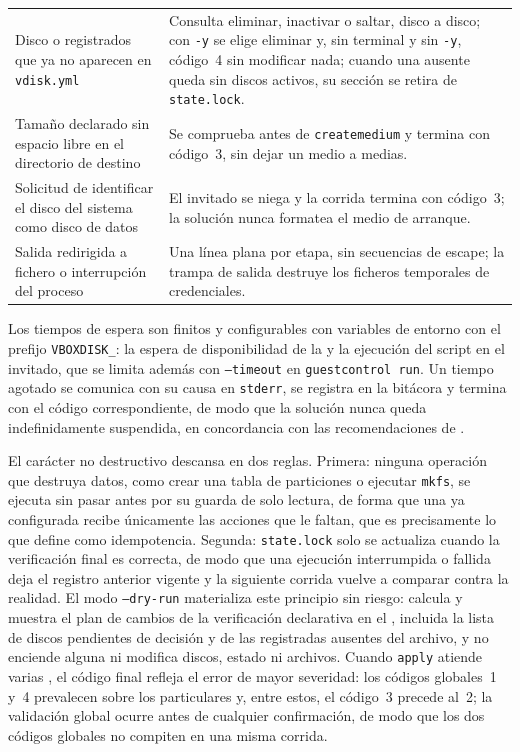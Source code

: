 \begin{table}[H]
\begin{tabular}{@{}p{5.8cm}p{10.0cm}@{}}
        Disco o \vm{} registrados que ya no aparecen en \texttt{vdisk.yml} & Consulta eliminar, inactivar o saltar, disco a disco; con \texttt{-y} se elige eliminar y, sin terminal y sin \texttt{-y}, código~4 sin modificar nada; cuando una \vm{} ausente queda sin discos activos, su sección se retira de \texttt{state.lock}. \\
        Tamaño declarado sin espacio libre en el directorio de destino & Se comprueba antes de \texttt{createmedium} y termina con código~3, sin dejar un medio a medias. \\
        Solicitud de identificar el disco del sistema como disco de datos & El invitado se niega y la corrida termina con código~3; la solución nunca formatea el medio de arranque. \\
        Salida redirigida a fichero o interrupción del proceso & Una línea plana por etapa, sin secuencias de escape; la trampa de salida destruye los ficheros temporales de credenciales. \\
        \bottomrule
    \end{tabular}
\end{table}

Los tiempos de espera son finitos y configurables con variables de entorno con el prefijo \texttt{VBOXDISK\_}: la espera de disponibilidad de la \vm{} y la ejecución del script en el invitado, que se limita además con \texttt{--timeout} en \texttt{guestcontrol run}. Un tiempo agotado se comunica con su causa en \texttt{stderr}, se registra en la bitácora y termina con el código correspondiente, de modo que la solución nunca queda indefinidamente suspendida, en concordancia con las recomendaciones de \textcite{bash_best_practices}.

El carácter no destructivo descansa en dos reglas. Primera: ninguna operación que destruya datos, como crear una tabla de particiones o ejecutar \texttt{mkfs}, se ejecuta sin pasar antes por su guarda de solo lectura, de forma que una \vm{} ya configurada recibe únicamente las acciones que le faltan, que es precisamente lo que \textcite{idempotency_concept} define como idempotencia. Segunda: \texttt{state.lock} solo se actualiza cuando la verificación final es correcta, de modo que una ejecución interrumpida o fallida deja el registro anterior vigente y la siguiente corrida vuelve a comparar contra la realidad. El modo \texttt{--dry-run} materializa este principio sin riesgo: calcula y muestra el plan de cambios de la verificación declarativa en el \host{}, incluida la lista de discos pendientes de decisión y de las \vm{} registradas ausentes del archivo, y no enciende \vm{} alguna ni modifica discos, estado ni archivos. Cuando \texttt{apply} atiende varias \vm{}, el código final refleja el error de mayor severidad: los códigos globales~1 y~4 prevalecen sobre los particulares y, entre estos, el código~3 precede al~2; la validación global ocurre antes de cualquier confirmación, de modo que los dos códigos globales no compiten en una misma corrida.

